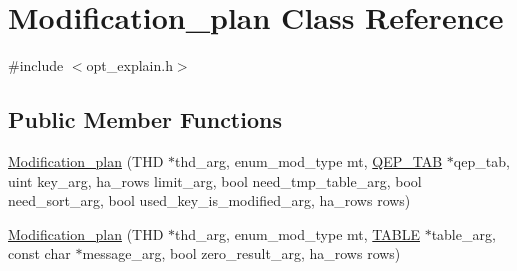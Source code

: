 \hypertarget{classModification__plan}{}\section{Modification\+\_\+plan Class Reference}
\label{classModification__plan}


{\ttfamily \#include $<$opt\+\_\+explain.\+h$>$}

\subsection*{Public Member Functions}
\begin{DoxyCompactItemize}
\item 
\mbox{\hyperlink{classModification__plan_a0df82723d55b566d68c49b33c0bf26fe}{Modification\+\_\+plan}} (T\+HD $\ast$thd\+\_\+arg, enum\+\_\+mod\+\_\+type mt, \mbox{\hyperlink{classQEP__TAB}{Q\+E\+P\+\_\+\+T\+AB}} $\ast$qep\+\_\+tab, uint key\+\_\+arg, ha\+\_\+rows limit\+\_\+arg, bool need\+\_\+tmp\+\_\+table\+\_\+arg, bool need\+\_\+sort\+\_\+arg, bool used\+\_\+key\+\_\+is\+\_\+modified\+\_\+arg, ha\+\_\+rows rows)
\item 
\mbox{\hyperlink{classModification__plan_a53d45efe019d13f893144bd03159c1bd}{Modification\+\_\+plan}} (T\+HD $\ast$thd\+\_\+arg, enum\+\_\+mod\+\_\+type mt, \mbox{\hyperlink{structTABLE}{T\+A\+B\+LE}} $\ast$table\+\_\+arg, const char $\ast$message\+\_\+arg, bool zero\+\_\+result\+\_\+arg, ha\+\_\+rows rows)
\end{DoxyCompactItemize}
